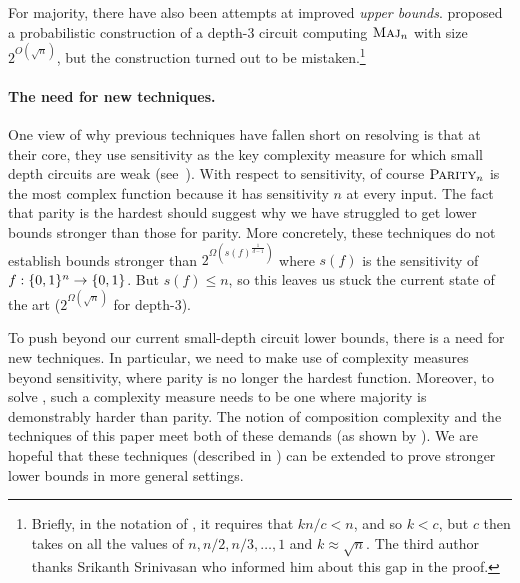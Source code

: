 \documentclass[10pt,a4paper]{article}
\theoremstyle{definition}
\theoremstyle{remark}
\newcommand{\mathsc}[1]{{\normalfont\textsc{#1}}}
\DeclarePairedDelimiter{\set}{\{}{\}}
\DeclareMathOperator{\Maj}{\mathsc{Maj}}
\newcommand{\Parity}{\mathsc{Parity}}
\newcommand{\Majority}{\Maj}
\newcommand{\zo}{\set{0,1}}
\begin{document}
For majority, there have also been attempts at improved \emph{upper bounds}. \cite{Wol06} proposed a probabilistic construction of a depth-3 circuit computing $\Majority_n$ with size $2^{O(\sqrt{n})}$, but the construction turned out to be mistaken.\footnote{Briefly, in the notation of \cite{Wol06}, it requires that $kn/c < n$, and so $k < c$, but $c$ then takes on all the values of $n, n/2, n/3, \ldots, 1$ and $k \approx \sqrt{n}$. The third author thanks Srikanth Srinivasan \cite{Sri15} who informed him about this gap in the proof.}















\paragraph*{The need for new techniques.}  
One view of why previous techniques have fallen short on resolving  is that at their core, they use sensitivity as the key complexity measure  for which small depth circuits are weak (see~\cite{Bop97,Ros18,MW19}). With respect to sensitivity, of course $\Parity_n$ is the most complex function because it has sensitivity $n$ at every input.
The fact that parity is the hardest should suggest why we have struggled to get lower bounds stronger than those for parity.
More concretely, these techniques do not establish bounds stronger than $2^{\Omega(s(f)^{\frac{1}{d -1}})}$  where $s(f)$ is the sensitivity of $f:\zo^n\to\zo$. But $s(f)\leq n$, so this leaves us stuck the current state of the art ($2^{\Omega(\sqrt{n})}$ for depth-3).

To push beyond our current small-depth circuit lower bounds, there is a need for new techniques.
In particular, we need to make use of complexity measures beyond sensitivity, where parity is no longer the hardest function.
Moreover, to solve , such a complexity measure needs to be one where majority is demonstrably harder than parity.
The notion of composition complexity and the techniques of this paper meet both of these demands (as shown by ).
We are hopeful that these techniques (described in ) can be extended to prove stronger lower bounds in more general settings.
\end{document}
